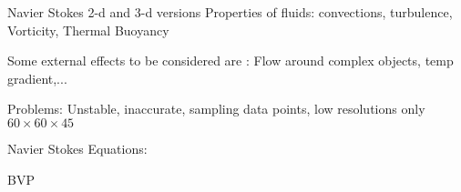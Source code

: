 Navier Stokes
2-d and 3-d versions
Properties of fluids:  convections, turbulence, Vorticity, Thermal Buoyancy

Some external effects to be considered are : Flow around complex objects, temp gradient,...

Problems: Unstable, inaccurate, sampling data points, low resolutions only $60\times 60 \times 45$

Navier Stokes Equations:

BVP